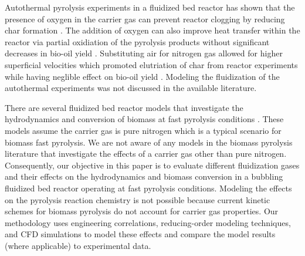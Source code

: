 Autothermal pyrolysis experiments in a fluidized bed reactor has shown that the presence of oxygen in the carrier gas can prevent reactor clogging by reducing char formation \cite{Kim-2014}. The addition of oxygen can also improve heat transfer within the reactor via partial oxidiation of the pyrolysis products without significant decreases in bio-oil yield \cite{Polin-2019a}. Substituting air for nitrogen gas allowed for higher superficial velocities which promoted elutriation of char from reactor experiments while having neglible effect on bio-oil yield \cite{Polin-2019b}. Modeling the fluidization of the autothermal experiments was not discussed in the available literature.

There are several fluidized bed reactor models that investigate the hydrodynamics and conversion of biomass at fast pyrolysis conditions \cite{Papadikis-2009, Papadikis-2010, Mellin-2014, Xiong-2016, Xue-2011}. These models assume the carrier gas is pure nitrogen which is a typical scenario for biomass fast pyrolysis. We are not aware of any models in the biomass pyrolysis literature that investigate the effects of a carrier gas other than pure nitrogen. Consequently, our objective in this paper is to evaluate different fluidization gases and their effects on the hydrodynamics and biomass conversion in a bubbling fluidized bed reactor operating at fast pyrolysis conditions. Modeling the effects on the pyrolysis reaction chemistry is not possible because current kinetic schemes for biomass pyrolysis do not account for carrier gas properties. Our methodology uses engineering correlations, reducing-order modeling techniques, and CFD simulations to model these effects and compare the model results (where applicable) to experimental data.

